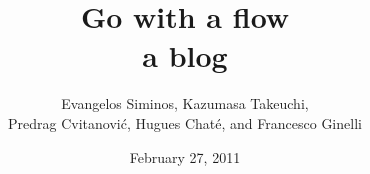\title{ 			Go with a flow
       \\ \Huge 	a blog
        \\\vspace{1.0cm}
        }\author{Evangelos Siminos,
		Kazumasa Takeuchi,
		\\
        Predrag Cvitanovi\'{c},
        Hugues Chat\'e, and Francesco Ginelli
        }

        \date{February 27, 2011} \Private{\date{\today}}
